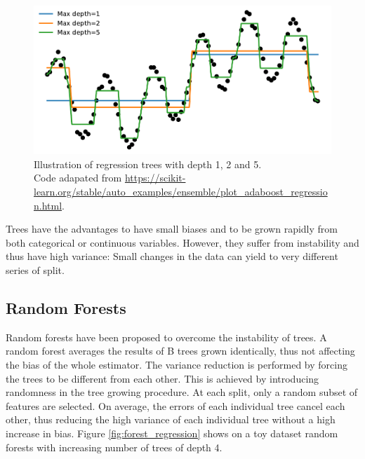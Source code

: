 \documentclass[french,12pt,twoside,a4paper]{book}
\begin{document}
\begin{appendices}
  \begin{figure}[!b]
    \centering
    \includegraphics[width=0.8\linewidth]{img/chapter_1/tree_3.pdf}
    \caption{Illustration of regression trees with depth 1, 2 and 5.\\Code
      adapated from
      \url{https://scikit-learn.org/stable/auto_examples/ensemble/plot_adaboost_regression.html}.}%
    \label{fig:tree_regression}
  \end{figure}

  Trees have the advantages to have small biases and to be grown rapidly from
  both categorical or continuous variables. However, they suffer from
  instability and thus have high variance: Small changes in the data can yield
  to very different series of split.

  \subsection{Random Forests}\label{apd:intro:random_forests}

  Random forests \citep{breiman2001random} have been proposed to overcome the
  instability of trees. A random forest averages the results of B trees grown
  identically, thus not affecting the bias of the whole estimator. The variance
  reduction is performed by forcing the trees to be different from each other.
  This is achieved by introducing randomness in the tree growing procedure. At
  each split, only a random subset of features are selected. On average, the
  errors of each individual tree cancel each other, thus reducing the high
  variance of each individual tree without a high increase in bias. Figure
  \ref{fig:forest_regression} shows on a toy dataset random forests with
  increasing number of trees of depth 4.


\end{appendices}
\end{document}
